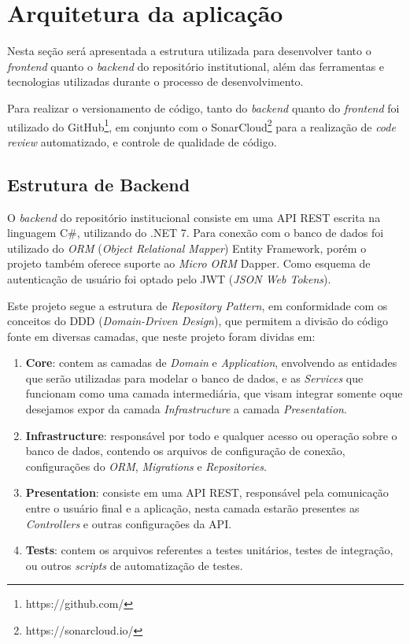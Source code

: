 \section{Arquitetura da aplicação}

Nesta seção será apresentada a estrutura utilizada para desenvolver tanto o
\emph{frontend} quanto o \emph{backend} do repositório institutional, além das
ferramentas e tecnologias utilizadas durante o processo de desenvolvimento.

Para realizar o versionamento de código, tanto do \emph{backend} quanto do
\emph{frontend} foi utilizado do GitHub\footnote{https://github.com/}, em
conjunto com o SonarCloud\footnote{https://sonarcloud.io/} para a realização
de \emph{code review} automatizado, e controle de qualidade de código.

\subsection{Estrutura de Backend}

O \emph{backend} do repositório institucional consiste em uma API REST escrita na
linguagem C\#, utilizando do .NET 7. Para conexão com o banco de dados foi utilizado
do \emph{ORM} (\emph{Object Relational Mapper}) Entity Framework, porém o projeto
também oferece suporte ao \emph{Micro ORM} Dapper. Como esquema de autenticação
de usuário foi optado pelo JWT (\emph{JSON Web Tokens}).

Este projeto segue a estrutura de \emph{Repository Pattern}, em conformidade com os
conceitos do DDD (\emph{Domain-Driven Design}), que permitem a divisão do código
fonte em diversas camadas, que neste projeto foram dividas em:

\begin{enumerate}
    \item \textbf{Core}: contem as camadas de \emph{Domain} e \emph{Application},
          envolvendo as entidades que serão utilizadas para modelar o banco de dados,
          e as \emph{Services} que funcionam como uma camada intermediária, que visam
          integrar somente oque desejamos expor da camada \emph{Infrastructure} a
          camada \emph{Presentation}.

    \item \textbf{Infrastructure}: responsável por todo e qualquer acesso ou operação
          sobre o banco de dados, contendo os arquivos de configuração de conexão,
          configurações do \emph{ORM}, \emph{Migrations} e \emph{Repositories}.

    \item \textbf{Presentation}: consiste em uma API REST, responsável pela comunicação
          entre o usuário final e a aplicação, nesta camada estarão presentes as
          \emph{Controllers} e outras configurações da API.

    \item \textbf{Tests}: contem os arquivos referentes a testes unitários, testes de
          integração, ou outros \emph{scripts} de automatização de testes.
\end{enumerate}

